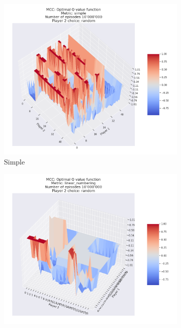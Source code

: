 \begin{figure}[ht!]
    \begin{subfigure}{0.5\textwidth}
        \includegraphics[width=1\linewidth]{Figures/mcc_simple_10000000_random} 
        \caption[Simple]{Simple}
        \label{fig:mccSimple}
    \end{subfigure}
    \begin{subfigure}{0.5\textwidth}
        \includegraphics[width=1\linewidth]{Figures/mcc_linear_numbering_10000000_random}

\end{subfigure}
\end{figure}
